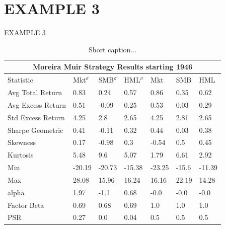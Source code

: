 \documentclass[9pt]{beamer}
\begin{document}
\section{EXAMPLE 3}
\begin{frame}{EXAMPLE 3}
    \begin{table}[H]
	\begin{center}
    \begin{tabular}{l l l l l l l}
    \toprule
    \multicolumn{7}{c}{Moreira Muir Strategy Results starting 1946} \\
    \midrule
             Statistic &     Mkt$^{\sigma}$ &     SMB$^{\sigma}$ &    HML$^{\sigma}$ &     Mkt &    SMB &     HML \\
    \midrule
  Avg Total Return &    0.83 &    0.24 &    0.57 &    0.86 &   0.35 &    0.62 \\
 Avg Excess Return &    0.51 &   -0.09 &    0.25 &    0.53 &   0.03 &    0.29 \\
 Std Excess Return &    4.25 &     2.8 &    2.65 &    4.25 &   2.81 &    2.65 \\
  Sharpe Geometric &    0.41 &   -0.11 &    0.32 &    0.44 &   0.03 &    0.38 \\
          Skewness &    0.17 &   -0.98 &     0.3 &   -0.54 &    0.5 &    0.45 \\
          Kurtosis &    5.48 &     9.6 &    5.07 &    1.79 &   6.61 &    2.92 \\
               Min &  -20.19 &  -20.73 &  -15.38 &  -23.25 &  -15.6 &  -11.39 \\
               Max &   28.08 &   15.96 &   16.24 &   16.16 &  22.19 &   14.28 \\
             alpha &    1.97 &    -1.1 &    0.68 &    -0.0 &   -0.0 &    -0.0 \\
       Factor Beta &    0.69 &    0.68 &    0.69 &     1.0 &    1.0 &     1.0 \\
               PSR &    0.27 &     0.0 &    0.04 &     0.5 &    0.5 &     0.5 \\
    \bottomrule
    \end{tabular}
	\caption{Short caption...}
    \label{tab:MMresults}
    \end{center}
    \end{table}
\end{frame}
\end{document}
